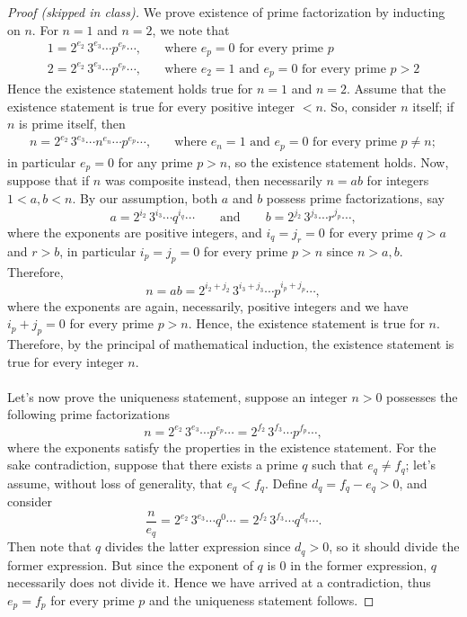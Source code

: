 \begin{proof}[Proof (skipped in class)] We prove existence of prime factorization by inducting on $n$. For $n = 1$ and $n = 2$, we note that 
\begin{align*}
1 = 2^{e_2}\,3^{e_3}\cdots p^{e_p}\cdots, &\quad \text{where $e_p = 0$ for every prime $p$}\\[0.5em]
2 = 2^{e_2}\,3^{e_3}\cdots p^{e_p}\cdots, &\quad \text{where $e_2 = 1$ and $e_p = 0$ for every prime $p>2$}
\end{align*}
Hence the existence statement holds true for $n = 1$ and $n = 2$. Assume that the existence statement is true for every positive integer $< n$. So, consider $n$ itself; if $n$ is prime itself, then
\begin{align*}
n = 2^{e_2}\,3^{e_3}\cdots n^{e_n} \cdots p^{e_p}\cdots, &\quad \text{where $e_n = 1$ and $e_p = 0$ for every prime $p \neq n$};
\end{align*}
in particular $e_p = 0$ for any prime $p> n$, so the existence statement holds. Now, suppose that if $n$ was composite instead, then necessarily $n = ab$ for integers $1 < a,b < n$. By our assumption, both $a$ and $b$ possess prime factorizations, say
\[a = 2^{i_2}\,3^{i_3}\cdots q^{i_q}\cdots \qquad \text{and} \qquad b = 2^{j_2}\,3^{j_3}\cdots r^{j_p}\cdots,\]
where the exponents are positive integers, and $i_q = j_r = 0$ for every prime $q > a$ and $r > b$, in particular $i_p = j_p = 0$ for every prime $p > n$ since $n>a,b$. Therefore,
\[n = ab = 2^{i_2 + j_2}\,3^{i_3 + j_3}\cdots p^{i_p + j_p}\cdots,\]
where the exponents are again, necessarily, positive integers and we have $i_p + j_p = 0$ for every prime $p > n$. Hence, the existence statement is true for $n$.  Therefore, by the principal of mathematical induction, the existence statement is true for every integer $n$.\\
\\
Let's now prove the uniqueness statement, suppose an integer $n > 0$ possesses the following prime factorizations
\[n = 2^{e_2}\,3^{e_3}\cdots p^{e_p}\cdots = 2^{f_2}\,3^{f_3}\cdots p^{f_p}\cdots,\]
where the exponents satisfy the properties in the existence statement. For the sake contradiction, suppose that there exists a prime $q$ such that $e_q \neq f_q$; let's assume, without loss of generality, that $e_q < f_q$. Define $d_q = f_q - e_q > 0$, and consider 
\[\frac{n}{e_q} = 2^{e_2}\,3^{e_3}\cdots q^{0}\cdots = 2^{f_2}\,3^{f_3}\cdots q^{d_q}\cdots.\]
Then note that $q$ divides the latter expression since $d_q > 0$, so it should divide the former expression. But since the exponent of $q$ is $0$ in the former expression, $q$ necessarily does not divide it. Hence we have arrived at a contradiction, thus $e_p = f_p$ for every prime $p$ and the uniqueness statement follows.
\end{proof}


